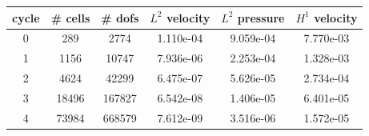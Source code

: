 \documentclass[10pt]{report}
\begin{document}
\begin{table}[H]
\begin{center}
\begin{tabular}{|c|c|c|c|c|c|} \hline
cycle & \# cells & \# dofs & $L^2$ velocity & $L^2$ pressure & $H^1$ velocity\\ \hline
0 & 289 & 2774 & 1.110e-04 & 9.059e-04 & 7.770e-03\\ \hline
1 & 1156 & 10747 & 7.936e-06 & 2.253e-04 & 1.328e-03\\ \hline
2 & 4624 & 42299 & 6.475e-07 & 5.626e-05 & 2.734e-04\\ \hline
3 & 18496 & 167827 & 6.542e-08 & 1.406e-05 & 6.401e-05\\ \hline
4 & 73984 & 668579 & 7.612e-09 & 3.516e-06 & 1.572e-05\\ \hline
\end{tabular}
\end{center}
\end{table}
\end{document}
